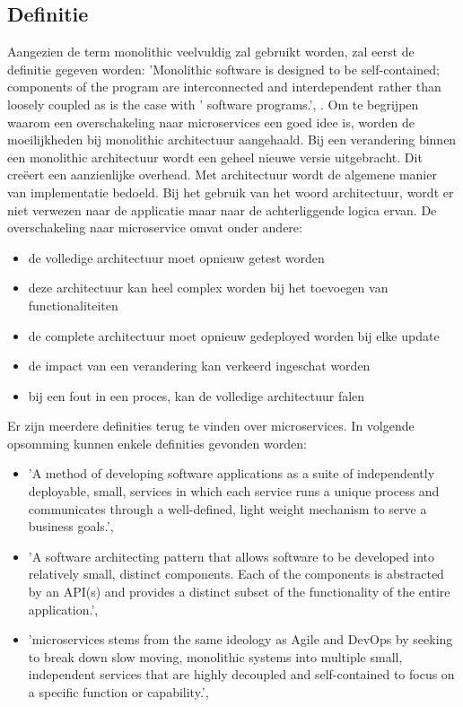 \subsection{Definitie}
Aangezien de term monolithic veelvuldig zal gebruikt worden, zal eerst de definitie gegeven worden:  'Monolithic software is designed to be self-contained; components of the program are interconnected and interdependent rather than loosely coupled as is the case with ' software programs.',  \textcite{Wigmore2016}.
Om te begrijpen waarom een overschakeling naar microservices een goed idee is, worden de moeilijkheden bij monolithic architectuur aangehaald. Bij een verandering binnen een monolithic architectuur wordt een geheel nieuwe versie uitgebracht. Dit creëert een aanzienlijke overhead. Met architectuur wordt de algemene manier van implementatie bedoeld. Bij het gebruik van het woord architectuur, wordt er niet verwezen naar de applicatie maar naar de achterliggende logica ervan.
De overschakeling naar microservice omvat onder andere:
\begin{itemize}
	\item de volledige architectuur moet opnieuw getest worden
	\item deze architectuur kan heel complex worden bij het toevoegen van functionaliteiten
	\item de complete architectuur moet opnieuw gedeployed worden bij elke update
	\item de impact van een verandering kan verkeerd ingeschat worden
	\item bij een fout in een proces, kan de volledige architectuur falen
\end{itemize}
Er zijn meerdere definities terug te vinden over microservices. In volgende opsomming kunnen enkele definities gevonden worden:
\begin{itemize}
	\item 'A method of developing software applications as a suite of independently deployable, small, services in which each service runs a unique process and communicates through a  well-defined, light weight mechanism to serve a business goals.', \textcite{Mauersberger2017}
	\item 'A software architecting pattern that allows software to be developed into relatively small, distinct components. Each of the components is abstracted by an API(s) and provides a distinct subset of the functionality of the entire application.', \textcite{Watts2018}
	\item 'microservices stems from the same ideology as Agile and DevOps by seeking to break down slow moving, monolithic systems into multiple small, independent services that are highly decoupled and self-contained to focus on a specific function or capability.', \textcite{Benetis2016a}
\end{itemize}
